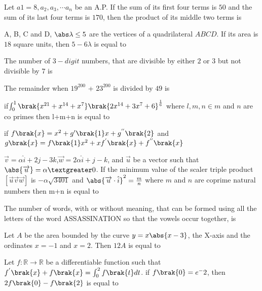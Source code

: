 \iffalse
\title{Assignment 3}
\author{AI24BTECH11018}
\section{integer}
\fi
\item Let $a1 = 8, a_2, a_3,\cdots  a_n$ be an A.P. If the sum of its 
first four terms is $50$ and the sum of its last four 
terms is $170$, then the product of its middle two 
terms is
\hfill{}
\item A, B, C and D, 
$\abs \lambda \leq 5$ are the vertices of a quadrilateral $ABCD$. If 
its area is $18$ square units, then $5-6\lambda$ is equal to
\hfill{}
\item The number of 
$3-digit$ numbers, that are divisible 
by either $2$ or $3$ but not divisible by $7$ is
\hfill{}
\item The remainder when $19^{200}$ + $23^{200}$ is divided by $49$
is 
\hfill{}
\item if$\int_{0}^{1}\brak{x^{21}+x^{14}+x^7}\brak{2x^{14}+3x^{7}+6}^\frac{1}{6}$ where $l,m,n \in m$ and $n$ are co primes then l+m+n is equal to
\hfill{}
\item if $f\brak{x}=x^2+g^{\prime} \brak{1}x+g^{''}\brak{2}$ and $g\brak{x}=f\brak{1}x^2+xf^{'}\brak{x}+f^{''}\brak{x}$
\hfill{}
\item $\overrightarrow{v}=\alpha \hat{i}+2j-3k$,$\overrightarrow{w}=2\alpha \hat{i}+j-k$, and $\overrightarrow{u}$ be a vector such that $\abs {\overrightarrow{u}}=\alpha  \textgreater 0$. If the minimum value of the scaler triple product $[\overrightarrow{u} \overrightarrow{v} \overrightarrow{w}]$ is $-\alpha \sqrt{3401}$ and $\abs {\overrightarrow{u}\cdot \hat{i}}^2=\frac{m}{n}$ where $m$ and $n$ are coprime natural numbers then m+n is equal to
\hfill{}
\item The number of words, with or without meaning, 
that can be formed using all the letters of the word 
ASSASSINATION so that the vowels occur 
together, is
\hfill{}
\item Let $A$ be the area bounded by the curve $y=x\abs {x-3}$, the X-axis and the ordinates $x=-1$ and $x=2$. Then $12A$ is equal to 
\hfill{}
\item Let $f:\mathbb{R} \to \mathbb{R}$ be a differentiable function such that $f^{'}\brak{x}+f\brak{x}=\int_{0}^{2}f\brak{t}dt$. if $f\brak{0}=e^-2$, then $2f\brak{0}-f\brak{2}$ is equal to
\hfill{}

%
